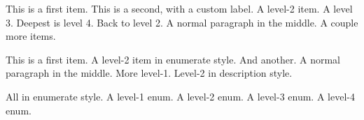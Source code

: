 \documentclass{article}
\begin{document}
\begin{outline}
\1 This is a first item.
\1[!!!] This is a second, with a custom label.
\2 A level-2 item.
\3 A level 3.
\4 Deepest is level 4.
\2 Back to level 2.
\0 A normal paragraph in the middle.
\1 A couple more
\2 items.
\end{outline}

\renewcommand{\outlineii}{enumerate}
\begin{outline}
\1 This is a first item.
\2 A level-2 item in enumerate style.
\2 And another.
\0 A normal paragraph in the middle.
\renewcommand{\outlineii}{description}
\1 More level-1.
\2[Descr] Level-2 in description style.
\end{outline}

\begin{outline}[enumerate]
\0 All in enumerate style.
\1 A level-1 enum.
\2 A level-2 enum.
\3 A level-3 enum.
\4 A level-4 enum.
\end{outline}
\end{document}
